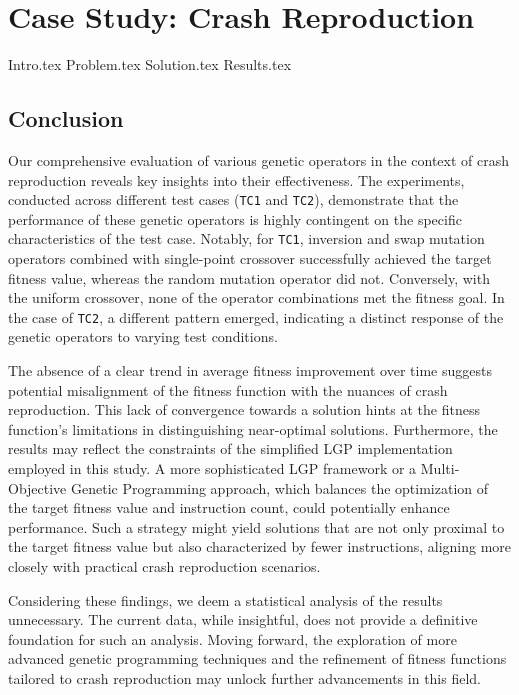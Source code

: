 \chapter{Case Study: Crash Reproduction}
\label{chap:beacon}
    {Intro.tex}
    {Problem.tex}
    {Solution.tex}
    {Results.tex}
    \section{Conclusion}
    \label{sec:bea  con:conclusion}

        Our comprehensive evaluation of various genetic operators in the context of crash reproduction reveals key 
        insights into their effectiveness. The experiments, conducted across different test cases (\texttt{TC1} and 
        \texttt{TC2}), demonstrate that the performance of these genetic operators is highly contingent on the specific 
        characteristics of the test case. Notably, for \texttt{TC1}, inversion and swap mutation operators combined with 
        single-point crossover successfully achieved the target  fitness value, whereas the random mutation operator did 
        not. Conversely, with the uniform crossover, none of the operator combinations met the fitness goal. In the case 
        of \texttt{TC2}, a different pattern emerged, indicating a distinct response of the genetic operators to varying 
        test conditions.

        The absence of a clear trend in average fitness improvement over time suggests potential misalignment of the 
        fitness function with the nuances of crash reproduction. This lack of convergence towards a solution hints at 
        the fitness function's limitations in distinguishing near-optimal solutions. Furthermore, the results may 
        reflect the constraints of the simplified LGP implementation employed in this study. A more sophisticated LGP 
        framework or a Multi-Objective Genetic Programming approach, which balances the optimization of the target 
        fitness value and instruction count, could potentially enhance performance. Such a strategy might yield 
        solutions that are not only proximal to the target fitness value but also characterized by fewer instructions, 
        aligning more closely with practical crash reproduction scenarios.

        Considering these findings, we deem a statistical analysis of the results unnecessary. The current data, while 
        insightful, does not provide a definitive foundation for such an analysis. Moving forward, the exploration of 
        more advanced genetic programming techniques and the refinement of fitness functions tailored to crash 
        reproduction may unlock further advancements in this field.
        
